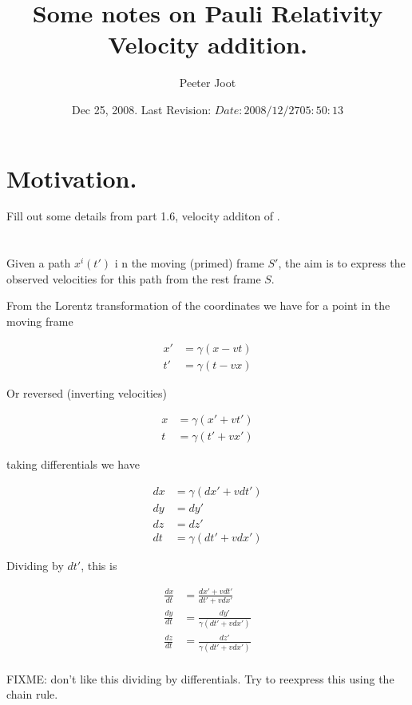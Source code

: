 \documentclass{article}
\title{ Some notes on Pauli Relativity Velocity addition. }
\author{Peeter Joot}
\date{ Dec 25, 2008.  Last Revision: $Date: 2008/12/27 05:50:13 $ }
\begin{document}
\maketitle{}
%

\section{ Motivation. }

Fill out some details from part 1.6, velocity additon of \cite{pauli1981tr}.

\section{ }

Given a path $x^i(t')$ i n the moving (primed) frame $S'$, the aim is to 
express the observed velocities for this path from the rest frame $S$.

From the Lorentz transformation of the coordinates we have for a point in the moving frame

\begin{align*}
x' &= \gamma ( x - vt) \\
t' &= \gamma ( t - vx)
\end{align*}

Or reversed (inverting velocities)

\begin{align*}
x &= \gamma ( x' + vt') \\
t &= \gamma ( t' + vx')
\end{align*}

taking differentials we have

\begin{align*}
dx &= \gamma ( dx' + v dt') \\
dy &= dy' \\
dz &= dz' \\
dt &= \gamma ( dt' + v dx')
\end{align*}

Dividing by $dt'$, this is

\begin{align*}
\frac{dx}{dt} &= \frac{ dx' + v dt' }{ dt' + v dx'} \\
\frac{dy}{dt} &= \frac{dy'}{\gamma (dt' + v dx')} \\
\frac{dz}{dt} &= \frac{dz'}{\gamma (dt' + v dx')} \\
\end{align*}

FIXME: don't like this dividing by differentials.  Try to reexpress this 
using the chain rule.
\end{document}
